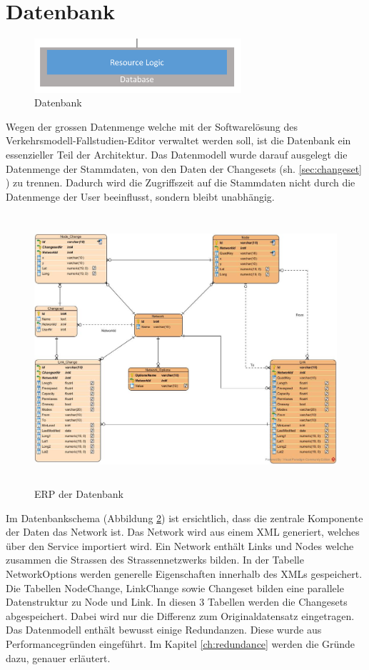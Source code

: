 \section{Datenbank}
\begin{figure}[H]
\centering
\includegraphics[height=2cm]{images/Database.png}
\caption{Datenbank}
\label{fig:database}
\end{figure}
\noindent
Wegen der grossen Datenmenge welche mit der Softwarelösung des Verkehrsmodell-Fallstudien-Editor verwaltet werden soll, ist die Datenbank ein essenzieller Teil der Architektur. Das Datenmodell wurde darauf ausgelegt die Datenmenge der Stammdaten, von den Daten der Changesets (sh. \ref{sec:changeset} ) zu trennen. Dadurch wird die Zugriffszeit auf die Stammdaten nicht durch die Datenmenge der User beeinflusst, sondern bleibt unabhängig.
\begin{figure}[H]
\centering
\includegraphics[height=10cm]{images/SimmapDatabase.jpg}
\caption{ERP der Datenbank}
\label{fig:databasescheme}
\end{figure}
\noindent
Im Datenbankschema (Abbildung \ref{fig:databasescheme}) ist ersichtlich, dass die zentrale Komponente der Daten das Network ist. Das Network wird aus einem XML generiert, welches über den Service importiert wird. Ein Network enthält Links und Nodes welche zusammen die Strassen des Strassennetzwerks bilden. In der Tabelle Network\textunderscore Options werden generelle Eigenschaften innerhalb des XMLs gespeichert.\\
Die Tabellen Node\textunderscore Change, Link\textunderscore Change sowie Changeset bilden eine parallele Datenstruktur zu Node und Link. In diesen 3 Tabellen werden die Changesets abgespeichert. Dabei wird nur die Differenz zum Originaldatensatz eingetragen.\\
Das Datenmodell enthält bewusst einige Redundanzen. Diese wurde aus Performancegründen eingeführt. Im Kapitel \ref{ch:redundance}  werden die Gründe dazu, genauer erläutert.